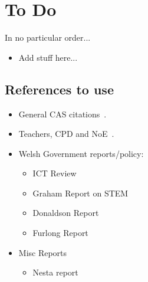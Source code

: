 \documentclass{sig-alternate}
\begin{document}




\section*{To Do}

In no particular order...

\begin{itemize}
\item Add stuff here...
\end{itemize}

\subsection*{References to use}
\begin{itemize}
\item
General CAS
citations~\cite{crick+sentance:2011,brown-et-al-sigcse2012,brown-et-al-toce2014}.

\item
Teachers, CPD and
NoE~\cite{sentance-et-al-wipsce2012,sentance-et-al:2013,sentance-et-al:2014}.

\item
Welsh Government reports/policy:
\begin{itemize}
\item
ICT Review~\cite{welshictreview:2013}
\item
Graham Report on STEM~\cite{STEMreview:2014}
\item
Donaldson Report~\cite{Donaldson:2015}
\item
Furlong Report~\cite{Furlong:2015}
\end{itemize}

\item
Misc Reports
\begin{itemize}
\item
Nesta report~\cite{NESTA:2015}

\end{itemize}
\end{itemize}
\end{document}
